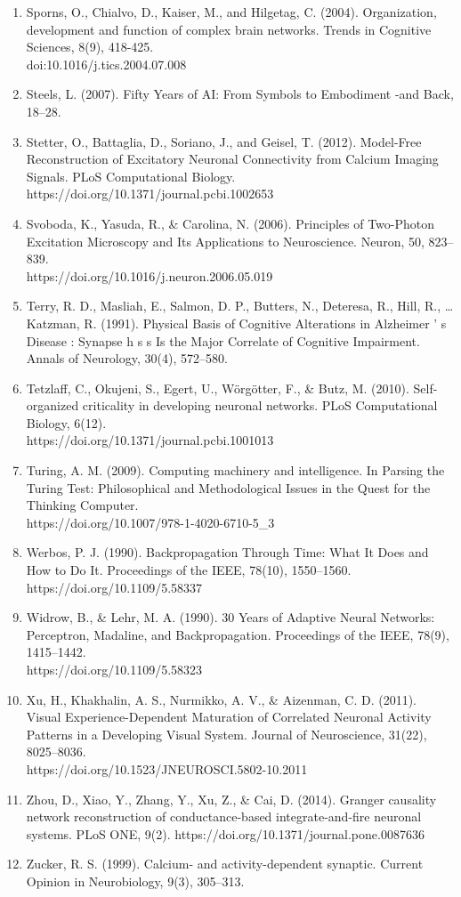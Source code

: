 \documentclass[11pt]{article}
\begin{document}
\begin{enumerate}
\item Sporns, O., Chialvo, D., Kaiser, M., and Hilgetag, C. (2004). Organization, development and function of complex brain networks. Trends in Cognitive Sciences, 8(9), 418-425. \\doi:10.1016/j.tics.2004.07.008
\item Steels, L. (2007). Fifty Years of AI: From Symbols to Embodiment -and Back, 18–28.
\item Stetter, O., Battaglia, D., Soriano, J., and Geisel, T. (2012). Model-Free Reconstruction of Excitatory Neuronal Connectivity from Calcium Imaging Signals. PLoS Computational Biology. https://doi.org/10.1371/journal.pcbi.1002653
\item Svoboda, K., Yasuda, R., \& Carolina, N. (2006). Principles of Two-Photon Excitation Microscopy and Its Applications to Neuroscience. Neuron, 50, 823–839.\\https://doi.org/10.1016/j.neuron.2006.05.019
\item Terry, R. D., Masliah, E., Salmon, D. P., Butters, N., Deteresa, R., Hill, R., … Katzman, R. (1991). Physical Basis of Cognitive Alterations in Alzheimer ’ s Disease : Synapse h s s Is the Major Correlate of Cognitive Impairment. Annals of Neurology, 30(4), 572–580.
\item Tetzlaff, C., Okujeni, S., Egert, U., Wörgötter, F., \& Butz, M. (2010). Self-organized criticality in developing neuronal networks. PLoS Computational Biology, 6(12).\\https://doi.org/10.1371/journal.pcbi.1001013
\item Turing, A. M. (2009). Computing machinery and intelligence. In Parsing the Turing Test: Philosophical and Methodological Issues in the Quest for the Thinking Computer.\\https://doi.org/10.1007/978-1-4020-6710-5\_3
\item Werbos, P. J. (1990). Backpropagation Through Time: What It Does and How to Do It. Proceedings of the IEEE, 78(10), 1550–1560. https://doi.org/10.1109/5.58337
\item Widrow, B., \& Lehr, M. A. (1990). 30 Years of Adaptive Neural Networks: Perceptron, Madaline, and Backpropagation. Proceedings of the IEEE, 78(9), 1415–1442.\\https://doi.org/10.1109/5.58323
\item Xu, H., Khakhalin, A. S., Nurmikko, A. V., \& Aizenman, C. D. (2011). Visual Experience-Dependent Maturation of Correlated Neuronal Activity Patterns in a Developing Visual System. Journal of Neuroscience, 31(22), 8025–8036.\\ https://doi.org/10.1523/JNEUROSCI.5802-10.2011
\item Zhou, D., Xiao, Y., Zhang, Y., Xu, Z., \& Cai, D. (2014). Granger causality network reconstruction of conductance-based integrate-and-fire neuronal systems. PLoS ONE, 9(2). https://doi.org/10.1371/journal.pone.0087636
\item Zucker, R. S. (1999). Calcium- and activity-dependent synaptic. Current Opinion in Neurobiology, 9(3), 305–313.
\end{enumerate}
\end{document}
